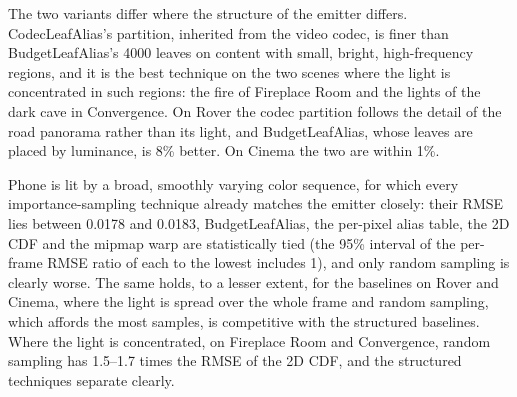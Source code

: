 \documentclass[10pt]{article}
\begin{document}
The two variants differ where the structure of the emitter differs. CodecLeafAlias's partition, inherited from the video codec, is finer than BudgetLeafAlias's 4000 leaves on content with small, bright, high-frequency regions, and it is the best technique on the two scenes where the light is concentrated in such regions: the fire of Fireplace Room and the lights of the dark cave in Convergence. On Rover the codec partition follows the detail of the road panorama rather than its light, and BudgetLeafAlias, whose leaves are placed by luminance, is 8\% better. On Cinema the two are within 1\%.

Phone is lit by a broad, smoothly varying color sequence, for which every importance-sampling technique already matches the emitter closely: their RMSE lies between 0.0178 and 0.0183, BudgetLeafAlias, the per-pixel alias table, the 2D CDF and the mipmap warp are statistically tied (the 95\% interval of the per-frame RMSE ratio of each to the lowest includes 1), and only random sampling is clearly worse. The same holds, to a lesser extent, for the baselines on Rover and Cinema, where the light is spread over the whole frame and random sampling, which affords the most samples, is competitive with the structured baselines. Where the light is concentrated, on Fireplace Room and Convergence, random sampling has 1.5--1.7 times the RMSE of the 2D CDF, and the structured techniques separate clearly.


\end{document}
